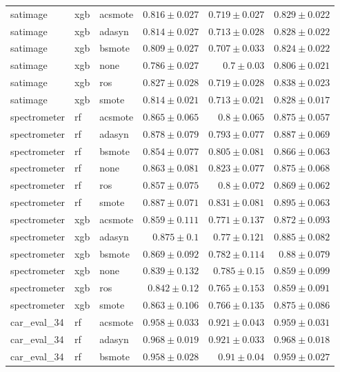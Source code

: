 \documentclass[conference,a4paper]{IEEEtran}
\begin{document}
\begin{table}[htbp]
\begin{tabular}{lllrrr}
satimage & xgb & acsmote & $0.816 \pm 0.027$ & $0.719 \pm 0.027$ & $0.829 \pm 0.022$ \\
satimage & xgb & adasyn & $0.814 \pm 0.027$ & $0.713 \pm 0.028$ & $0.828 \pm 0.022$ \\
satimage & xgb & bsmote & $0.809 \pm 0.027$ & $0.707 \pm 0.033$ & $0.824 \pm 0.022$ \\
satimage & xgb & none & $0.786 \pm 0.027$ & $0.7 \pm 0.03$ & $0.806 \pm 0.021$ \\
satimage & xgb & ros & $0.827 \pm 0.028$ & $0.719 \pm 0.028$ & $0.838 \pm 0.023$ \\
satimage & xgb & smote & $0.814 \pm 0.021$ & $0.713 \pm 0.021$ & $0.828 \pm 0.017$ \\
spectrometer & rf & acsmote & $0.865 \pm 0.065$ & $0.8 \pm 0.065$ & $0.875 \pm 0.057$ \\
spectrometer & rf & adasyn & $0.878 \pm 0.079$ & $0.793 \pm 0.077$ & $0.887 \pm 0.069$ \\
spectrometer & rf & bsmote & $0.854 \pm 0.077$ & $0.805 \pm 0.081$ & $0.866 \pm 0.063$ \\
spectrometer & rf & none & $0.863 \pm 0.081$ & $0.823 \pm 0.077$ & $0.875 \pm 0.068$ \\
spectrometer & rf & ros & $0.857 \pm 0.075$ & $0.8 \pm 0.072$ & $0.869 \pm 0.062$ \\
spectrometer & rf & smote & $0.887 \pm 0.071$ & $0.831 \pm 0.081$ & $0.895 \pm 0.063$ \\
spectrometer & xgb & acsmote & $0.859 \pm 0.111$ & $0.771 \pm 0.137$ & $0.872 \pm 0.093$ \\
spectrometer & xgb & adasyn & $0.875 \pm 0.1$ & $0.77 \pm 0.121$ & $0.885 \pm 0.082$ \\
spectrometer & xgb & bsmote & $0.869 \pm 0.092$ & $0.782 \pm 0.114$ & $0.88 \pm 0.079$ \\
spectrometer & xgb & none & $0.839 \pm 0.132$ & $0.785 \pm 0.15$ & $0.859 \pm 0.099$ \\
spectrometer & xgb & ros & $0.842 \pm 0.12$ & $0.765 \pm 0.153$ & $0.859 \pm 0.091$ \\
spectrometer & xgb & smote & $0.863 \pm 0.106$ & $0.766 \pm 0.135$ & $0.875 \pm 0.086$ \\
car_eval_34 & rf & acsmote & $0.958 \pm 0.033$ & $0.921 \pm 0.043$ & $0.959 \pm 0.031$ \\
car_eval_34 & rf & adasyn & $0.968 \pm 0.019$ & $0.921 \pm 0.033$ & $0.968 \pm 0.018$ \\
car_eval_34 & rf & bsmote & $0.958 \pm 0.028$ & $0.91 \pm 0.04$ & $0.959 \pm 0.027$ \\

\end{tabular}
\end{table}
\end{document}
